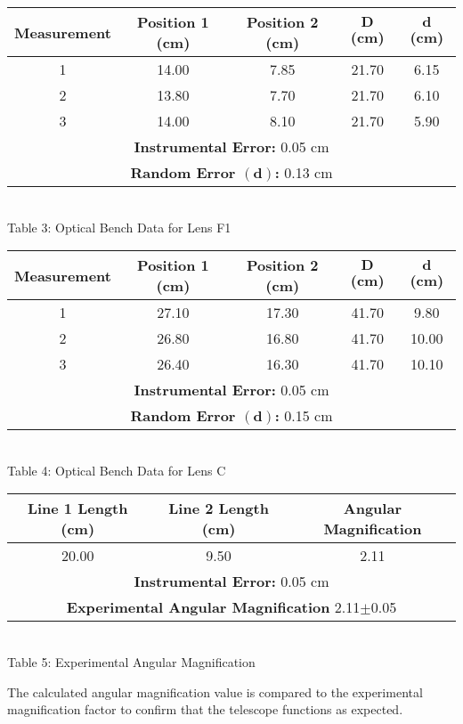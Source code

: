 \begin{center}
    \begin{tabular}{|c|c|c|c|c|}
        \hline
    \textbf{Measurement} & \textbf{Position 1 (cm)} & \textbf{Position 2 (cm)} & $\bm{D}$\textbf{ (cm)} & $\bm{d}$\textbf{ (cm)} \\ \hline
        1 & 14.00 & 7.85 & 21.70 & 6.15\\ 
        2 & 13.80 & 7.70 & 21.70 & 6.10\\ 
        3 & 14.00 & 8.10 & 21.70 & 5.90\\  \hline
        \multicolumn{5}{|c|}{\textbf{Instrumental Error:} 0.05 cm} \\
        \multicolumn{5}{|c|}{\textbf{Random Error $\bm{(d)}$:} 0.13 cm} \\
        \hline
    \end{tabular}
    \vspace{3mm}
    \\Table 3: Optical Bench Data for Lens F1\\
    \vspace{5mm}

    \begin{tabular}{|c|c|c|c|c|}
        \hline
        \textbf{Measurement} & \textbf{Position 1 (cm)} & \textbf{Position 2 (cm)} & $\bm{D}$\textbf{ (cm)} & $\bm{d}$\textbf{ (cm)} \\ \hline
        1 & 27.10 & 17.30 & 41.70 & 9.80\\ 
        2 & 26.80 & 16.80 & 41.70 & 10.00\\ 
        3 & 26.40 & 16.30 & 41.70 & 10.10\\  \hline
        \multicolumn{5}{|c|}{\textbf{Instrumental Error:} 0.05 cm} \\
        \multicolumn{5}{|c|}{\textbf{Random Error $\bm{(d)}$:} 0.15 cm} \\
        \hline
    \end{tabular}
    \vspace{3mm}
    \\Table 4: Optical Bench Data for Lens C\\
    \vspace{10mm}
    \begin{tabular}{|c|c|c|}
        \hline
        \textbf{Line 1 Length (cm)} & \textbf{Line 2 Length (cm)} & \textbf{Angular Magnification} \\ \hline
        20.00 & 9.50 & 2.11 \\ \hline
        \multicolumn{3}{|c|}{\textbf{Instrumental Error:} 0.05 cm} \\ 
        \multicolumn{3}{|c|}{\textbf{Experimental Angular Magnification} 2.11$\pm$0.05} \\ \hline
    \end{tabular}
    \vspace{3mm}
    \\Table 5: Experimental Angular Magnification\\
\end{center}
The calculated angular magnification value is compared to the experimental magnification factor to confirm that the telescope functions as expected.